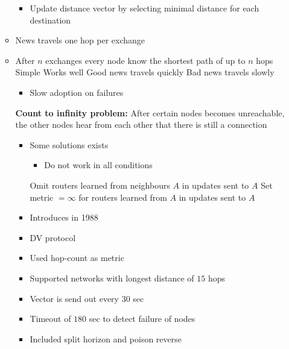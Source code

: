 \begin{itemize}
\begin{itemize}
\begin{itemize}
\begin{itemize}
\begin{itemize}
                                \end{itemize}
                        \end{itemize}
                    \item Update distance vector by selecting minimal distance for each destination
                \end{itemize}
            \item News travels one hop per exchange
            \item After $n$ exchanges every node know the shortest path of up to $n$ hops
            \ipro Simple
            \ipro Works well
            \ipro Good news travels quickly
            \icon Bad news travels slowly
                \begin{itemize}
                    \item Slow adoption on failures
                \end{itemize}
            \icon \textbf{Count to infinity problem:} After certain nodes becomes unreachable, the other nodes hear from each other that there is still a connection
                \begin{itemize}
                    \item Some solutions exists
                        \begin{itemize}
                            \item Do not work in all conditions
                        \end{itemize}
                     Omit routers learned from neighbours $A$ in updates sent to $A$
                     Set metric $=\infty$ for routers learned from $A$ in updates sent to $A$
                \end{itemize}
                \begin{itemize}
                    \item Introduces in 1988
                    \item DV protocol
                    \item Used hop-count as metric
                    \item Supported networks with longest distance of $15$ hops
                    \item Vector is send out every $30$ sec
                    \item Timeout of $180$ sec to detect failure of nodes
                    \item Included split horizon and poison reverse

\end{itemize}
\end{itemize}
\end{itemize}
